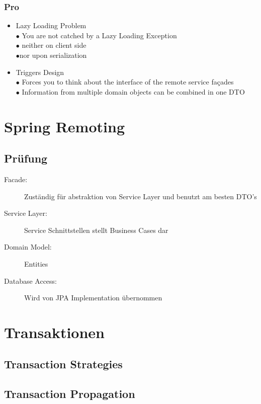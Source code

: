 \documentclass[10pt]{scrartcl}
\begin{document}
\subsubsection{Pro}
\begin{itemize}
\item Lazy Loading Problem\\
$\bullet$ You are not catched by a Lazy Loading Exception\\
\hspace*{0.5cm}$\bullet$ neither on client side\\
\hspace*{0.5cm}$\bullet$nor upon serialization
\item Triggers Design\\
$\bullet$ Forces you to think about the interface of the remote service façades\\
$\bullet$ Information from multiple domain objects can be combined in one DTO
\end{itemize}

\newpage
\section{Spring Remoting}
\subsection{Prüfung}
\begin{description}
\item[Facade:] Zuständig für abstraktion von Service Layer und benutzt am besten DTO's
\item[Service Layer:] Service Schnittstellen stellt Business Cases dar
\item[Domain Model:] Entities
\item[Database Access:] Wird von JPA Implementation übernommen
\end{description}

\newpage
\section{Transaktionen}
\subsection{Transaction Strategies}

\subsection{Transaction Propagation}
\end{document}
